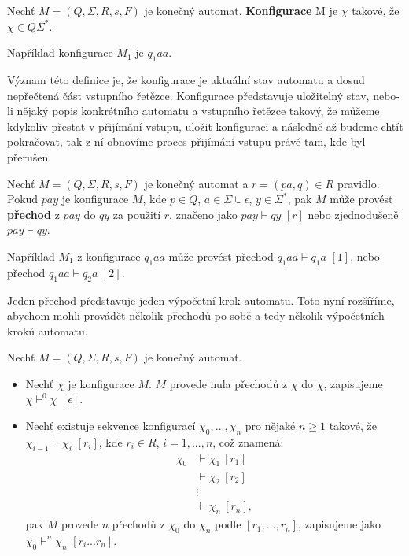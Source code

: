 \begin{definition}
    Nechť $M=(Q, \Sigma ,R,s,F)$ je konečný automat. \textbf{Konfigurace} M je $\chi $ takové, že $\chi \in Q \Sigma^* $.
\end{definition}

\begin{example}
    Například konfigurace $M_1$ je $q_1aa$.
\end{example}

Význam této definice je, že konfigurace je aktuální stav automatu a dosud nepřečtená část vstupního řetězce. Konfigurace představuje uložitelný stav, nebo-li nějaký popis konkrétního automatu a vstupního řetězce takový, že můžeme kdykoliv přestat v přijímání vstupu, uložit konfiguraci a následně až budeme chtít pokračovat, tak z ní obnovíme proces přijímání vstupu právě tam, kde byl přerušen.

\begin{definition}
    Nechť $M=(Q, \Sigma ,R,s,F)$ je konečný automat a $r=(pa,q) \in R $ pravidlo. Pokud $pay$ je konfigurace $M$, kde $p \in Q$, $a \in \Sigma \cup \epsilon$, $y \in \Sigma^*$, pak $M$ může provést \textbf{přechod} z $pay$ do $qy$ za použití $r$, značeno jako $pay \vdash qy$ $ [r] $ nebo zjednodušeně $pay \vdash qy$.
\end{definition}

\begin{example}
    Například $M_1$ z konfigurace $q_1aa$ může provést přechod $q_1aa \vdash q_1a$ $[1]$, nebo přechod $q_1aa \vdash q_2a$ $[2]$.
\end{example}

Jeden přechod představuje jeden výpočetní krok automatu. Toto nyní rozšíříme, abychom mohli provádět několik přechodů po sobě a tedy několik výpočetních kroků automatu.

\begin{definition}
    Nechť $M=(Q, \Sigma ,R,s,F)$ je konečný automat. 
    \begin{itemize}
        \item Nechť $\chi$ je konfigurace $M$. $M$ provede nula přechodů z $\chi $ do $\chi $, zapisujeme $\chi \vdash^0 \chi $ $[\epsilon ]$.
        \item Nechť existuje sekvence konfigurací $\chi_0,...,\chi_n $ pro nějaké $n \ge 1$ takové, že $\chi_{i-1} \vdash \chi_i $ $[r_i]$, kde $r_i \in R$, $i=1,...,n $, což znamená:
        \begin{align*}
            \chi_0 &\vdash \chi_1 ~ [r_1] \\
            &\vdash \chi_2 ~ [r_2] \\
            &\vdots \\
            &\vdash \chi_n ~ [r_n],
        \end{align*}
        pak $M$ provede $n$ přechodů z $\chi_0 $ do $\chi_n $ podle $[r_1,...,r_n]$, zapisujeme jako $\chi_0 \vdash^n \chi_n $ $[r_i...r_n]$.
    \end{itemize}
\end{definition}

